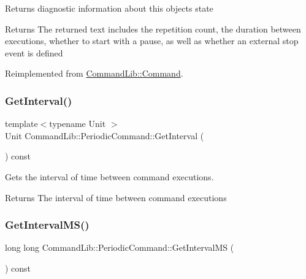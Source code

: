Returns diagnostic information about this object\textquotesingle{}s state 

\begin{DoxyReturn}{Returns}
The returned text includes the repetition count, the duration between executions, whether to start with a pause, as well as whether an external stop event is defined 
\end{DoxyReturn}


Reimplemented from \mbox{\hyperlink{class_command_lib_1_1_command_a795a185509e7b0fc1606b3b62fe17fbb}{Command\+Lib\+::\+Command}}.

\mbox{\label{class_command_lib_1_1_periodic_command_a4be16b8f26b54d9ca41f01f723eb7faf}} 
\subsubsection{\texorpdfstring{Get\+Interval()}{GetInterval()}}
{\footnotesize\ttfamily template$<$typename Unit $>$ \\
Unit Command\+Lib\+::\+Periodic\+Command\+::\+Get\+Interval (\begin{DoxyParamCaption}{ }\end{DoxyParamCaption}) const\hspace{0.3cm}{\ttfamily [inline]}}



Gets the interval of time between command executions. 

\begin{DoxyReturn}{Returns}
The interval of time between command executions
\end{DoxyReturn}
\mbox{\label{class_command_lib_1_1_periodic_command_abef034455e746be6367651cc05702344}} 
\subsubsection{\texorpdfstring{Get\+Interval\+M\+S()}{GetIntervalMS()}}
{\footnotesize\ttfamily long long Command\+Lib\+::\+Periodic\+Command\+::\+Get\+Interval\+MS (\begin{DoxyParamCaption}{ }\end{DoxyParamCaption}) const}



